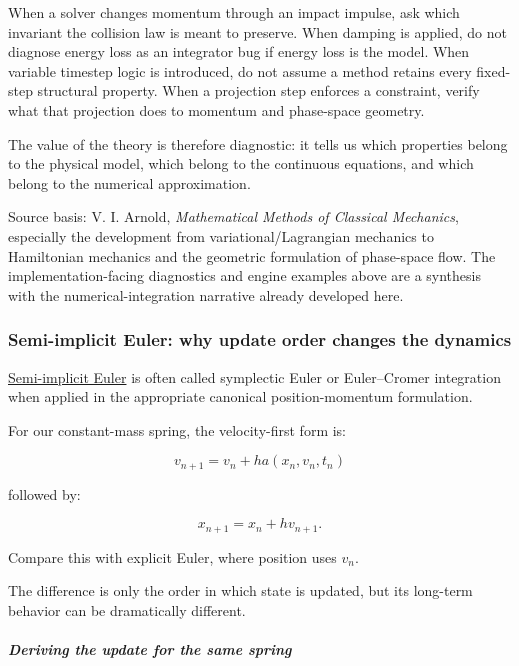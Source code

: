 When a solver changes momentum through an impact impulse, ask which invariant the collision law is meant to preserve. When damping is applied, do not diagnose energy loss as an integrator bug if energy loss is the model. When variable timestep logic is introduced, do not assume a method retains every fixed-step structural property. When a projection step enforces a constraint, verify what that projection does to momentum and phase-space geometry.

The value of the theory is therefore diagnostic: it tells us which properties belong to the physical model, which belong to the continuous equations, and which belong to the numerical approximation.

Source basis: V. I. Arnold, \emph{Mathematical Methods of Classical Mechanics}, especially the development from variational/Lagrangian mechanics to Hamiltonian mechanics and the geometric formulation of phase-space flow. The implementation-facing diagnostics and engine examples above are a synthesis with the numerical-integration narrative already developed here.

\subsubsection{Semi-implicit Euler: why update order changes the dynamics}\label{02-foundations-ii-ch025-semi-implicit-euler-why-update-order-changes-the-dynamics}

\hypertarget{02-foundations-ii-ch025-semi-implicit-euler-why-update-order-changes-the-dynamics}{}

\hyperref[02-foundations-ii-ch025-odes-and-numerical-simulation]{Semi-implicit Euler} is often called symplectic Euler or Euler--Cromer integration when applied in the appropriate canonical position-momentum formulation.

For our constant-mass spring, the velocity-first form is:

\[
\boxed{ v_{n+1}=v_n+h a(x_n,v_n,t_n) }
\]

followed by:

\[
\boxed{ x_{n+1}=x_n+h v_{n+1} }.
\]

Compare this with explicit Euler, where position uses \(v_n\).

The difference is only the order in which state is updated, but its long-term behavior can be dramatically different.

\subparagraph{Deriving the update for the same spring}\label{02-foundations-ii-ch025-deriving-the-update-for-the-same-spring}

